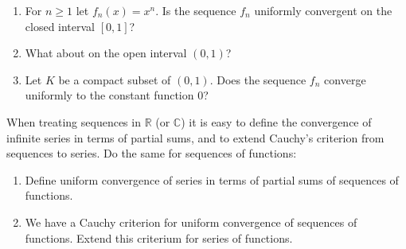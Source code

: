 \documentclass[11pt]{article}%
\newcommand{\R}{\mathbb{R}}
\newcommand{\C}{\mathbb{C}}
\begin{document}
\begin{Exercise}[title=*$\dagger$]
\begin{enumerate}
	\item For $n\geq 1$ let $f_n(x)=x^n$. Is the sequence $f_n$ uniformly convergent on the closed interval $[0,1]$?
	\item What about on the open interval $(0,1)$?  
	\item Let $K$ be a compact subset of $(0,1)$. Does the sequence $f_n$ converge uniformly to the constant function 0?  
\end{enumerate}
\end{Exercise}

\begin{Exercise}[title=*$\dagger$]
	When treating sequences in $\R$ (or $\C$) it is easy to define the convergence of infinite series in terms of partial sums, and to extend Cauchy's criterion from sequences to series. Do the same for sequences of functions:
	\begin{enumerate}
		\item Define uniform convergence of series in terms of partial sums of sequences of functions.
		\item We have a Cauchy criterion for uniform convergence of sequences of functions. Extend this criterium for series of functions.
	\end{enumerate}
\end{Exercise}
\end{document}
